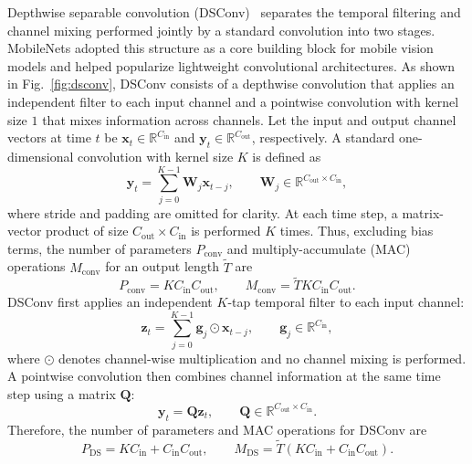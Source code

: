 Depthwise separable convolution (DSConv)~\cite{howard2017mobilenets} separates the temporal filtering and channel mixing performed jointly by a standard convolution into two stages.
MobileNets adopted this structure as a core building block for mobile vision models and helped popularize lightweight convolutional architectures.
As shown in Fig.~\ref{fig:dsconv}, DSConv consists of a depthwise convolution that applies an independent filter to each input channel and a pointwise convolution with kernel size $1$ that mixes information across channels.
Let the input and output channel vectors at time $t$ be $\mathbf{x}_t\in\mathbb{R}^{C_{\mathrm{in}}}$ and $\mathbf{y}_t\in\mathbb{R}^{C_{\mathrm{out}}}$, respectively.
A standard one-dimensional convolution with kernel size $K$ is defined as
\begin{equation}
\mathbf{y}_t = \sum_{j=0}^{K-1} \mathbf{W}_j\mathbf{x}_{t-j},\qquad
\mathbf{W}_j\in\mathbb{R}^{C_{\mathrm{out}}\times C_{\mathrm{in}}},
\label{eq:standard_conv1d}
\end{equation}
where stride and padding are omitted for clarity.
At each time step, a matrix-vector product of size $C_{\mathrm{out}}\times C_{\mathrm{in}}$ is performed $K$ times.
Thus, excluding bias terms, the number of parameters $P_{\mathrm{conv}}$ and multiply-accumulate (MAC) operations $M_{\mathrm{conv}}$ for an output length $\tilde{T}$ are
\begin{equation}
P_{\mathrm{conv}} = K C_{\mathrm{in}} C_{\mathrm{out}},\qquad
M_{\mathrm{conv}} = \tilde{T} K C_{\mathrm{in}} C_{\mathrm{out}}.
\label{eq:conv_complexity}
\end{equation}
DSConv first applies an independent $K$-tap temporal filter to each input channel:
\begin{equation}
\mathbf{z}_t = \sum_{j=0}^{K-1} \mathbf{g}_j \odot \mathbf{x}_{t-j},\qquad
\mathbf{g}_j \in \mathbb{R}^{C_{\mathrm{in}}},
\label{eq:depthwise_conv1d}
\end{equation}
where $\odot$ denotes channel-wise multiplication and no channel mixing is performed.
A pointwise convolution then combines channel information at the same time step using a matrix $\mathbf{Q}$:
\begin{equation}
\mathbf{y}_t = \mathbf{Q}\mathbf{z}_t,\qquad
\mathbf{Q}\in\mathbb{R}^{C_{\mathrm{out}}\times C_{\mathrm{in}}}.
\label{eq:pointwise_conv1d}
\end{equation}
Therefore, the number of parameters and MAC operations for DSConv are
\begin{equation}
P_{\mathrm{DS}} = K C_{\mathrm{in}} + C_{\mathrm{in}}C_{\mathrm{out}},\qquad
M_{\mathrm{DS}} = \tilde{T} \left(K C_{\mathrm{in}} + C_{\mathrm{in}}C_{\mathrm{out}} \right).
\label{eq:dsconv_complexity}
\end{equation}
 
